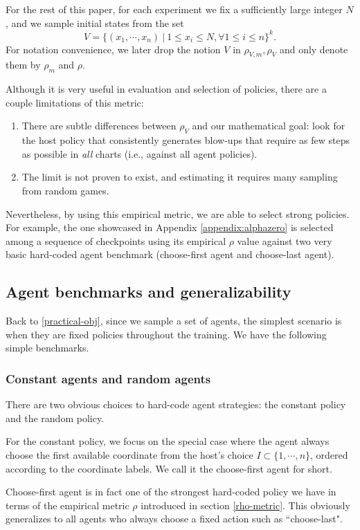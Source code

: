 \documentclass{article}
\theoremstyle{plain}
\theoremstyle{definition}
\theoremstyle{remark}
\begin{document}
For the rest of this paper, for each experiment we fix a sufficiently large integer $N$, and we sample initial states from the set \[V=\{(x_1, \cdots, x_n) ~|~ 1\leq x_i\leq N, \forall 1\leq i\leq n\}^k.\]
For notation convenience, we later drop the notion $V$ in $\rho_{V, m}, \rho_V$ and only denote them by $\rho_m$ and $\rho$.

Although it is very useful in evaluation and selection of policies, there are a couple limitations of this metric:
\begin{enumerate}
    \item There are subtle differences between $\rho_V$ and our mathematical goal: look for the host policy that consistently generates blow-ups that require as few steps as possible in \emph{all} charts (i.e., against all agent policies).
    \item The limit is not proven to exist, and estimating it requires many sampling from random games.
\end{enumerate}

Nevertheless, by using this empirical metric, we are able to select strong policies. For example, the one showcased in Appendix \ref{appendix:alphazero} is selected among a sequence of checkpoints using its empirical $\rho$ value against two very basic hard-coded agent benchmark (choose-first agent and choose-last agent).

\subsection{Agent benchmarks and generalizability}
Back to \eqref{practical-obj}, since we sample a set of agents, the simplest scenario is when they are fixed policies throughout the training. We have the following simple benchmarks.

\subsubsection{Constant agents and random agents}
There are two obvious choices to hard-code agent strategies: the constant policy and the random policy. 

For the constant policy, we focus on the special case where the agent always choose the first available coordinate from the host's choice $I\subset\{1,\cdots,n\}$, ordered according to the coordinate labels. We call it the choose-first agent for short.

Choose-first agent is in fact one of the strongest hard-coded policy we have in terms of the empirical metric $\rho$ introduced in section \ref{rho-metric}. This obviously generalizes to all agents who always choose a fixed action such as ``choose-last". 
\end{document}
